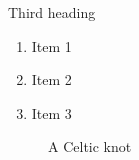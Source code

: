 \documentclass{beamer}
\begin{document}
\begin{frame}{Third heading}

\begin{enumerate}
\item Item 1
\item Item 2
\item Item 3
\end{enumerate}

\end{frame}


\begin{frame}

\begin{figure}
    \caption{A Celtic knot}
    \label{fig:knot}
\end{figure}

\end{frame}


\begin{frame}
\printbibliography %
\end{frame}
\end{document}
